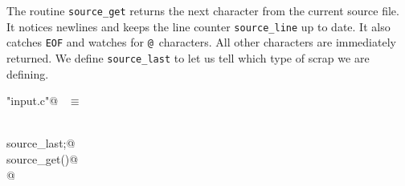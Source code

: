 \documentclass{report}
\begin{document}
The routine \verb|source_get| returns the next character from the
current source file. It notices newlines and keeps the line counter 
\verb|source_line| up to date. It also catches \verb|EOF| and watches
for \verb|@|~characters. All other characters are immediately returned.
We define \verb|source_last| to let us tell which type of scrap we
are defining.
\begin{flushleft} \small
\begin{minipage}{\linewidth} \label{scrap139}
\verb@"input.c"@\nobreak\ {\footnotesize {} }$\equiv$
\vspace{-1ex}
\begin{list}{}{} \item
\mbox{}\verb@@\\
\mbox{}\verb@int source_last;@\\
\mbox{}\verb@int source_get()@\\
\mbox{}@\\
\mbox{}\verb@@{\NWsep}
\end{list}
\vspace{-1ex}
\footnotesize\addtolength{\baselineskip}{-1ex}
\begin{list}{}{\setlength{\itemsep}{-\parsep}\setlength{\itemindent}{-\leftmargin}}

\end{list}
\end{minipage}
\end{flushleft}
\end{document}
